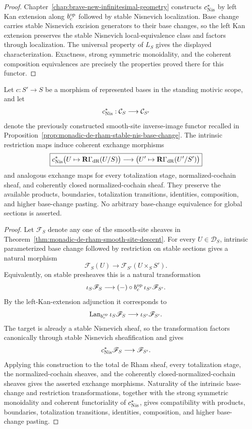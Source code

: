 \begin{proof}
Chapter~\ref{chap:brave-new-infinitesimal-geometry} constructs
\(c^*_{\mathrm{Nis}}\) by left Kan extension along \(b_c^{\mathrm{op}}\) followed by stable
Nisnevich localization.  Base change carries stable Nisnevich excision
generators to their base changes, so the left Kan extension preserves the
stable Nisnevich local-equivalence class and factors through localization.
The universal property of \(L_S\) gives the displayed characterization.
Exactness, strong symmetric monoidality, and the coherent composition
equivalences are precisely the properties proved there for this functor.
\end{proof}


\begin{proposition}
\label{prop:monadic-de-rham-smooth-site-exchange}
Let \(c:S'\to S\) be a morphism of represented bases in the standing motivic scope, and let
\[
    c^*_{\mathrm{Nis}}:\mathcal C_S\longrightarrow\mathcal C_{S'}
\]
denote the previously constructed smooth-site inverse-image functor recalled in
Proposition~\ref{prop:monadic-de-rham-stable-nis-base-change}.  The intrinsic restriction maps
induce coherent exchange morphisms
\[
\boxed{
    c^*_{\mathrm{Nis}}
    \bigl(
        U\mapsto\mathbf R\Gamma_{\mathrm{dR}}(U/S)
    \bigr)
    \longrightarrow
    \bigl(
        U'\mapsto\mathbf R\Gamma_{\mathrm{dR}}(U'/S')
    \bigr)
}
\]
and analogous exchange maps for every totalization stage, normalized-cochain sheaf, and coherently closed normalized-cochain sheaf.
They preserve the available products, boundaries, totalization transitions, identities, composition, and
higher base-change pasting.  No arbitrary base-change equivalence for global sections is asserted.
\end{proposition}

\begin{proof}
Let \(\mathscr F_S\) denote any one of the smooth-site sheaves in
Theorem~\ref{thm:monadic-de-rham-smooth-site-descent}.  For every \(U\in\mathcal D_S\), intrinsic
parameterized base change followed by restriction on stable sections gives a natural morphism
\[
    \mathscr F_S(U)
    \longrightarrow
    \mathscr F_{S'}(U\times_SS').
\]
Equivalently, on stable presheaves this is a natural transformation
\[
    \iota_S\mathscr F_S
    \longrightarrow
    (-)\circ b_c^{\mathrm{op}}\,\iota_{S'}\mathscr F_{S'}.
\]
By the left-Kan-extension adjunction it corresponds to
\[
    \operatorname{Lan}_{b_c^{\mathrm{op}}}
    \iota_S\mathscr F_S
    \longrightarrow
    \iota_{S'}\mathscr F_{S'}.
\]
The target is already a stable Nisnevich sheaf, so the transformation factors canonically through
stable Nisnevich sheafification and gives
\[
    c^*_{\mathrm{Nis}}\mathscr F_S
    \longrightarrow
    \mathscr F_{S'}.
\]
Applying this construction to the total de Rham sheaf, every totalization stage, the normalized-cochain sheaves, and the
coherently closed-normalized-cochain sheaves gives the asserted exchange morphisms.  Naturality of the intrinsic
base-change and restriction transformations, together with the strong symmetric monoidality and
coherent functoriality of \(c^*_{\mathrm{Nis}}\), gives compatibility with products, boundaries, totalization transitions,
identities, composition, and higher base-change pasting.
\end{proof}

